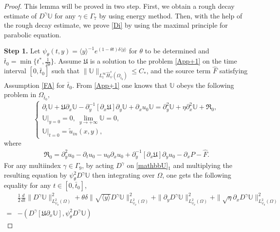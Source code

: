 \documentclass{amsart}
\numberwithin{equation}{section}
\newcommand\y{{{\langle y \rangle}}}
\begin{document}
\begin{proof}
This lemma will be proved in two step. First, we obtain a rough decay estimate of $D^{\gamma}\mathbb{U}$ for any $\gamma\in\Gamma_{7}$ by using energy method. Then, with the help of the rough decay estimate, we prove \eqref{Di} by using the maximal principle for parabolic equation.

\textbf{Step 1.} Let $\psi_{\theta}(t,y)=\y^{-1}e^{(1-\theta t)\delta\y}$ for $\theta$ to be determined and $\bar{t}_{0}=\min\{t^{*},\frac{1}{2\theta}\}$. Assume $\mathfrak{U}$ is a solution to the problem \eqref{App+1} on the time interval $[0,\bar{t}_{0}]$ such that $\|\mathbb{U}\|_{L_{t}^{\infty}\hat{H}_{\psi}^{s}(\Omega_{\bar{t}_{0}})}\leq C_{*}$,
and the source term $\hat{F}$ satisfying Assumption \ref{FA} for $\bar{t}_{0}$.
From \eqref{App+1} one knows that $\mathbb{U}$ obeys the following problem in $\Omega_{\bar{t}_{0}}$,
\begin{equation}\label{mathbbU}
\begin{cases}
\partial_{t}\mathbb{U}
+\mathfrak{U}\partial_{x}\mathbb{U}
-\partial_{y}^{-1}[\partial_{x}\mathfrak{U}]\partial_{y}\mathbb{U}
+\partial_{x}u_{0}\mathbb{U}
=\partial_{y}^{2}\mathbb{U}+\eta\partial_{x}^{2}\mathbb{U}+\mathfrak{R}_{0},\\
\mathbb{U}|_{y=0}=0,~\lim\limits_{y\to+\infty}\mathbb{U}=0,\\
\mathbb{U}|_{t=0}=\tilde{u}_{in}(x,y),
\end{cases}
\end{equation}
where
\begin{align*}
\mathfrak{R}_{0}
=\partial_{y}^{2}u_{0}-\partial_{t}u_{0}-u_{0}\partial_{x}u_{0}+\partial_{y}^{-1}[\partial_{x}\mathfrak{U}]\partial_{y}u_{0}-\partial_{x}P-\hat{F}.
\end{align*}
For any multiindex $\gamma\in\Gamma_{9}$, by acting $D^{\gamma}$ on \eqref{mathbbU}$_{1}$ and multiplying the resulting equation by $\psi_{\theta}^{2}D^{\gamma}\mathbb{U}$ then integrating over $\Omega$, one gets the following equality for any  $t\in[0,\bar{t}_{0}]$,
\begin{align}\label{DmathbbUE}
&\frac{1}{2}\frac{d}{dt}\|D^{\gamma}\mathbb{U}\|_{L_{\psi_{\theta}}^{2}(\Omega)}^{2}
+\theta\delta\|\sqrt{\y}D^{\gamma}\mathbb{U}\|_{L_{\psi_{\theta}}^{2}(\Omega)}^{2}
+\|\partial_{y}D^{\gamma}\mathbb{U}\|_{L_{\psi_{\theta}}^{2}(\Omega)}^{2}
+\|\sqrt{\eta}\partial_{x}D^{\gamma}\mathbb{U}\|_{L_{\psi_{\theta}}^{2}(\Omega)}^{2}\\
=&-(D^{\gamma}[\mathfrak{U}\partial_{x}\mathbb{U}],\psi_{\theta}^{2}D^{\gamma}\mathbb{U})

\end{align}
\end{proof}
\end{document}
